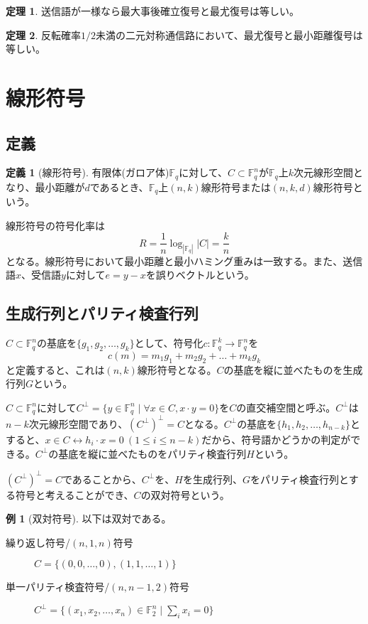 \documentclass{jsarticle}
\newcommand{\F}{\mathbb{F}}
\renewcommand{\(}{\left(}
\renewcommand{\)}{\right)}
\theoremstyle{definition}
\newtheorem{dfn}{定義}
\newtheorem{thm}{定理}
\newtheorem{ex}{例}
\begin{document}
\begin{thm}
    送信語が一様なら最大事後確立復号と最尤復号は等しい。
\end{thm}
\begin{thm}
    反転確率$1/2$未満の二元対称通信路において、最尤復号と最小距離復号は等しい。
\end{thm}

\section{線形符号}

\subsection{定義}

\begin{dfn}[線形符号]
    有限体(ガロア体)$\F_q$に対して、$C \subset \F_q^n$が$\F_q$上$k$次元線形空間となり、最小距離が$d$であるとき、$\F_q$上$(n, k)$線形符号または$(n, k, d)$線形符号という。
\end{dfn}
線形符号の符号化率は
    \[R = \frac{1}{n}\log_{|\F_q|}|C| = \frac{k}{n}\]
となる。線形符号において最小距離と最小ハミング重みは一致する。また、送信語$x$、受信語$y$に対して$e = y - x$を誤りベクトルという。

\subsection{生成行列とパリティ検査行列}

$C \subset \F_q^n$の基底を$\{g_1, g_2, \dots, g_k\}$として、符号化$c: \F_q^k \rightarrow \F_q^n$を
    \[c(m) = m_1g_1 + m_2g_2 + \dots + m_kg_k\]
と定義すると、これは$(n, k)$線形符号となる。$C$の基底を縦に並べたものを生成行列$G$という。

$C \subset \F_q^n$に対して$C^\perp = \{y \in \F_q^n \mid \forall x \in C, x \cdot y = 0\}$を$C$の直交補空間と呼ぶ。$C^\perp$は$n - k$次元線形空間であり、$(C^\perp)^\perp = C$となる。$C^\perp$の基底を$\{h_1, h_2, \dots, h_{n-k}\}$とすると、$x \in C \leftrightarrow h_i \cdot x = 0\ (1 \leq i \leq n - k)$だから、符号語かどうかの判定ができる。$C^\perp$の基底を縦に並べたものをパリティ検査行列$H$という。

$(C^\perp)^\perp = C$であることから、$C^\perp$を、$H$を生成行列、$G$をパリティ検査行列とする符号と考えることができ、$C$の双対符号という。

\begin{ex}[双対符号]
    以下は双対である。
    \begin{description}
        \item[繰り返し符号/$(n, 1, n)$符号] $C = \{(0, 0, \dots, 0), (1, 1, \dots, 1)\}$
        \item[単一パリティ検査符号/$(n, n-1, 2)$符号] $C^\perp = \{(x_1, x_2, \dots, x_n) \in \F_2^n \mid \sum_i x_i = 0\}$
    \end{description}
\end{ex}
\end{document}
